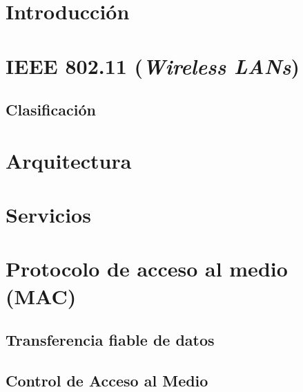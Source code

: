 





\tableofcontents
\clearpage 

\section{Introducción}

\section{IEEE 802.11 (\emph{Wireless LANs})}

\subsection{Clasificación}

\section{Arquitectura}

\section{Servicios}

\section{Protocolo de acceso al medio (MAC)}

\subsection{Transferencia fiable de datos}

\subsection{Control de Acceso al Medio}



















\clearpage
\printbibliography



